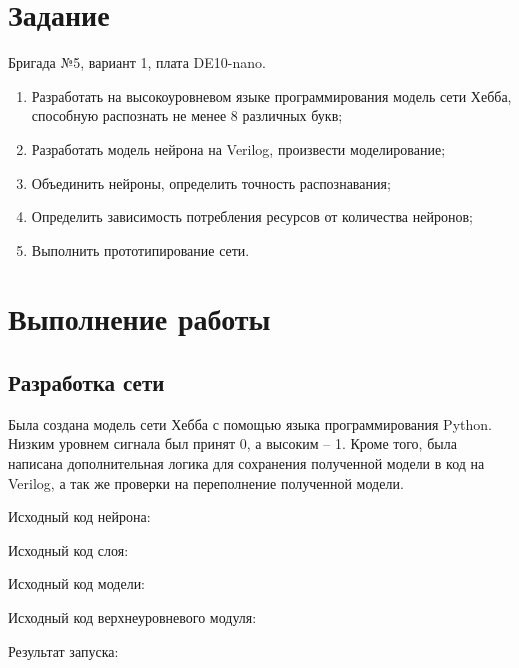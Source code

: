 \documentclass[a4paper,14pt]{article}
\begin{document}
    
    \tableofcontents
    \pagebreak


    \section{Задание}

    Бригада №5, вариант 1, плата DE10-nano.

    \begin{enumerate}
        \item Разработать на высокоуровневом языке программирования модель сети Хебба, способную распознать не менее 8 различных букв;
        \item Разработать модель нейрона на Verilog, произвести моделирование;
        \item Объединить нейроны, определить точность распознавания;
        \item Определить зависимость потребления ресурсов от количества нейронов;
        \item Выполнить прототипирование сети.
    \end{enumerate}


    \section{Выполнение работы}

    \subsection{Разработка сети}

    Была создана модель сети Хебба с помощью языка программирования Python.
    Низким уровнем сигнала был принят 0, а высоким -- 1.
    Кроме того, была написана дополнительная логика для сохранения полученной модели в код на Verilog,
    а так же проверки на переполнение полученной модели.

    Исходный код нейрона:
    {\small {}}

    Исходный код слоя:
    {\small {}}

    Исходный код модели:
    {\small {}}

    Исходный код верхнеуровневого модуля:
    {\small {}}

    Результат запуска:
    {\small {}}
\end{document}
